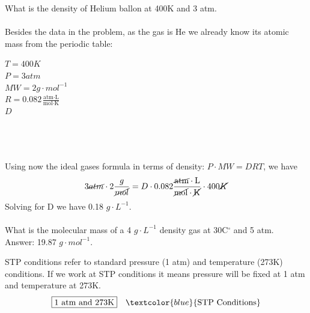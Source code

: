 \documentclass[main.tex]{subfiles}
\begin{document}
\begin{description}
\begin{example} %
What is the density of Helium ballon at 400K and 3 atm.
\\
\\
Besides the data in the problem, as the gas is He we already know its atomic mass from the periodic table:
\begin{tcbitemize}[raster columns=3, raster rows=3, enhanced, sharp corners, raster equal height=rows, raster force size=false, raster column skip=0pt, raster row skip = 0pt]
\tcbitem[blankest, width=1cm]
\tcbitem[header = helpful]
\texta
\tcbitem[header = harmful]
\textb
\tcbitem[firstcol = internal]
\textcn
\tcbitem[swotbox = G]
$T=400K$\\
$P=3atm$\\
$MW=2 g\cdot mol^{-1}$\\
$R=0.082\frac{\text{atm}\cdot \text{L}}{\text{mol}\cdot \text{K}}$\\
\tcbitem[swotbox = A]
$D$\\
\\
\\
\\
\end{tcbitemize}%
Using now the ideal gases formula in terms of density: $P\cdot MW=DRT$, we have
\begin{equation*}
3 \cancel{atm}\cdot 2\frac{g}{\cancel{mol}}=D\cdot 0.082\frac{\cancel{\text{atm}}\cdot \text{L}}{\cancel{\text{mol}}\cdot \cancel{\text{K}}}\cdot 400\cancel{K}
\end{equation*}
Solving for D we have 0.18 $g\cdot L^{-1}$.
\\
\faDiamond\ \\
What is the molecular mass of a 4 $g\cdot L^{-1}$ density gas at 30C$^{\circ}$ and 5 atm.
\\
\flushright Answer: 19.87 $g\cdot mol^{-1}$.
\end{example}%
\item[\docfilehook{STP conditions}{STP conditions}] 
STP conditions refer to standard pressure (1 atm) and temperature (273K) conditions. If we work at STP conditions it means pressure will be fixed at 1 atm and temperature at 273K.
\begin{equation*}
\boxed{  \text{1 atm and 273K}  } \quad \textcolor{blue}{\text{STP Conditions}}

\end{equation*}
\end{description}
\end{document}
